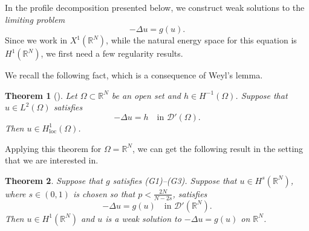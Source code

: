 \documentclass[12pt,leqno,twoside,sort]{amsart}
\newtheorem{Th}{Theorem}[section]
\newcommand{\R}{\mathbb{R}}
\newcommand{\cD}{{\mathcal D}}
\numberwithin{equation}{section}
\begin{document}
In the profile decomposition presented below, we construct weak solutions to the \textit{limiting problem}
$$
-\Delta u = g(u).
$$
Since we work in $X^1 (\R^N)$, while the natural energy space for this equation is $H^1 (\R^N)$, we first need a few regularity results.

We recall the following fact, which is a consequence of Weyl's lemma.

\begin{Th}[{\cite[Lemma 3]{DiFratta}}]\label{T:dystrybucje_na_H1}
Let $\Omega \subset \R^N$ be an open set and $h \in H^{-1} (\Omega)$. Suppose that $u \in L^2 (\Omega)$ satisfies
$$
-\Delta u = h \quad \mbox{in } \cD'(\Omega).
$$
Then $u \in H^{1}_{\mathrm{loc}} (\Omega)$.
\end{Th}

Applying this theorem for $\Omega=\R^N$, we can get the following result in the setting that we are interested in.

\begin{Th}\label{th:usuwanie_osobliwosci}
Suppose that $g$ satisfies (G1)--(G3). Suppose that $u \in H^s (\R^N)$, where $s \in (0,1)$ is chosen so that $p < \frac{2N}{N-2s}$, satisfies
$$
-\Delta u = g(u) \quad \mbox{in } \cD'(\R^N ).
$$
Then $u \in H^1 (\R^N)$ and $u$ is a weak solution to $-\Delta u = g(u)$ on $\R^N$.
\end{Th}
\end{document}
